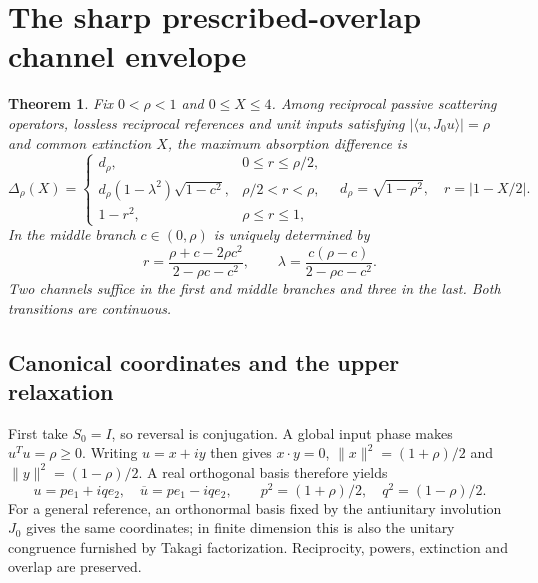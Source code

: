 \documentclass[11pt,a4paper]{article}
\newtheorem{theorem}{Theorem}[section]
\theoremstyle{remark}
\newcommand{\norm}[1]{\lVert #1\rVert}
\newcommand{\abs}[1]{\lvert #1\rvert}
\newcommand{\ip}[2]{\langle #1,#2\rangle}
\begin{document}
\section{The sharp prescribed-overlap channel envelope}\label{sec:joint}
\begin{theorem}\label{thm:joint}
Fix $0<\rho<1$ and $0\leq X\leq4$. Among reciprocal passive scattering operators, lossless reciprocal references and unit inputs satisfying $\abs{\ip u{J_0u}}=\rho$ and common extinction $X$, the maximum absorption difference is
\begin{equation}\label{eq:joint}
 \Delta_\rho(X)=
 \begin{cases}
 d_\rho,&0\leq r\leq\rho/2,\\
 d_\rho(1-\lambda^2)\sqrt{1-c^2},&\rho/2<r<\rho,\\
 1-r^2,&\rho\leq r\leq1,
 \end{cases}
 \quad d_\rho=\sqrt{1-\rho^2},\quad r=\abs{1-X/2}.
\end{equation}
In the middle branch $c\in(0,\rho)$ is uniquely determined by
\begin{equation}\label{eq:middle-parameters}
 r=\frac{\rho+c-2\rho c^2}{2-\rho c-c^2},\qquad
 \lambda=\frac{c(\rho-c)}{2-\rho c-c^2}.
\end{equation}
Two channels suffice in the first and middle branches and three in the last. Both transitions are continuous.
\end{theorem}

\subsection{Canonical coordinates and the upper relaxation}
First take $S_0=I$, so reversal is conjugation. A global input phase makes $u^Tu=\rho\geq0$. Writing $u=x+iy$ then gives $x\cdot y=0$, $\norm x^2=(1+\rho)/2$ and $\norm y^2=(1-\rho)/2$. A real orthogonal basis therefore yields
\[
 u=pe_1+iqe_2,\quad \overline u=pe_1-iqe_2,\qquad
 p^2=(1+\rho)/2,\quad q^2=(1-\rho)/2.
\]
For a general reference, an orthonormal basis fixed by the antiunitary involution $J_0$ gives the same coordinates; in finite dimension this is also the unitary congruence furnished by Takagi factorization. Reciprocity, powers, extinction and overlap are preserved.
\end{document}

